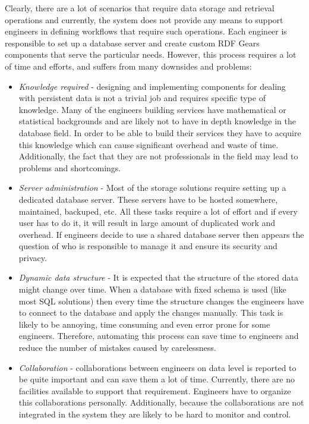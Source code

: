 Clearly, there are a lot of scenarios that require data storage and retrieval operations and currently, the system does not provide any means to support engineers in defining workflows that require such operations. Each engineer is responsible to set up a database server and create custom RDF Gears components that serve the particular needs. However, this process requires a lot of time and efforts, and suffers from many downsides and problems:

\begin{itemize}
	\item \textit{Knowledge required} - designing and implementing components for dealing with persistent data is not a trivial job and requires specific type of knowledge. Many of the engineers building services have mathematical or statistical backgrounds and are likely not to have in depth knowledge in the database field. In order to be able to build their services they have to acquire this knowledge which can cause significant overhead and waste of time. Additionally, the fact that they are not professionals in the field may lead to problems and shortcomings.
	
	\item \textit{Server administration} - Most of the storage solutions require setting up a dedicated database server. These servers have to be hosted somewhere, maintained, backuped, etc. All these tasks require a lot of effort and if every user has to do it, it will result in large amount of duplicated work and overhead. If engineers decide to use a shared database server then appears the question of who is responsible to manage it and ensure its security and privacy.
	
	\item \textit{Dynamic data structure} - It is expected that the structure of the stored data might change over time. When a database with fixed schema is used (like most SQL solutions) then every time the structure changes the engineers have to connect to the database and apply the changes manually. This task is likely to be annoying, time consuming and even error prone for some engineers. Therefore, automating this process can save time to engineers and reduce the number of mistakes caused by carelessness. 
	
	\item \textit{Collaboration} - collaborations between engineers on data level is reported to be quite important and can save them a lot of time. Currently, there are no facilities available to support that requirement. Engineers have to organize this collaborations personally. Additionally, because the collaborations are not integrated in the system they are likely to be hard to monitor and control.
	

\end{itemize}
